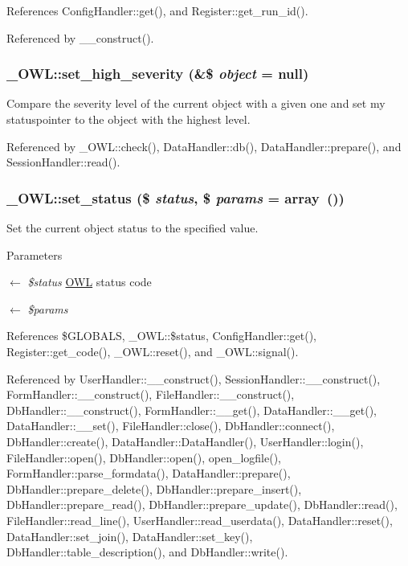 References ConfigHandler::get(), and Register::get\_\-run\_\-id().



Referenced by \_\-\_\-construct().

\subsubsection[{set\_\-high\_\-severity}]{\setlength{\rightskip}{0pt plus 5cm}\_\-OWL::set\_\-high\_\-severity (\&\$ {\em object} = {\ttfamily null})}\label{class__OWL_a576829692a3b66e3d518853bf43abae3}
Compare the severity level of the current object with a given one and set my statuspointer to the object with the highest level. 

Referenced by \_\-OWL::check(), DataHandler::db(), DataHandler::prepare(), and SessionHandler::read().

\subsubsection[{set\_\-status}]{\setlength{\rightskip}{0pt plus 5cm}\_\-OWL::set\_\-status (\$ {\em status}, \/  \$ {\em params} = {\ttfamily array~()})}\label{class__OWL_aea912d0ede9b3c2a69b79072d94d4787}
Set the current object status to the specified value.


\begin{DoxyParams}{Parameters}
\item[\mbox{$\leftarrow$} {\em \$status}]\hyperlink{classOWL}{OWL} status code \item[\mbox{$\leftarrow$} {\em \$params}]\end{DoxyParams}


References \$GLOBALS, \_\-OWL::\$status, ConfigHandler::get(), Register::get\_\-code(), \_\-OWL::reset(), and \_\-OWL::signal().



Referenced by UserHandler::\_\-\_\-construct(), SessionHandler::\_\-\_\-construct(), FormHandler::\_\-\_\-construct(), FileHandler::\_\-\_\-construct(), DbHandler::\_\-\_\-construct(), FormHandler::\_\-\_\-get(), DataHandler::\_\-\_\-get(), DataHandler::\_\-\_\-set(), FileHandler::close(), DbHandler::connect(), DbHandler::create(), DataHandler::DataHandler(), UserHandler::login(), FileHandler::open(), DbHandler::open(), open\_\-logfile(), FormHandler::parse\_\-formdata(), DataHandler::prepare(), DbHandler::prepare\_\-delete(), DbHandler::prepare\_\-insert(), DbHandler::prepare\_\-read(), DbHandler::prepare\_\-update(), DbHandler::read(), FileHandler::read\_\-line(), UserHandler::read\_\-userdata(), DataHandler::reset(), DataHandler::set\_\-join(), DataHandler::set\_\-key(), DbHandler::table\_\-description(), and DbHandler::write().

